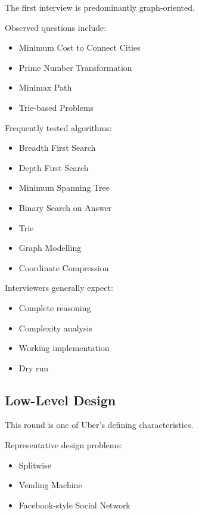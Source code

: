 \documentclass[11pt,a4paper]{article}
\begin{document}
The first interview is predominantly graph-oriented.

Observed questions include:

\begin{itemize}
	\item Minimum Cost to Connect Cities
	\item Prime Number Transformation
	\item Minimax Path
	\item Trie-based Problems
\end{itemize}

Frequently tested algorithms:

\begin{itemize}
	\item Breadth First Search
	\item Depth First Search
	\item Minimum Spanning Tree
	\item Binary Search on Answer
	\item Trie
	\item Graph Modelling
	\item Coordinate Compression
\end{itemize}

Interviewers generally expect:

\begin{itemize}
	\item Complete reasoning
	\item Complexity analysis
	\item Working implementation
	\item Dry run
\end{itemize}


\subsection{Low-Level Design}

This round is one of Uber's defining characteristics.

Representative design problems:

\begin{itemize}
	\item Splitwise
	\item Vending Machine
	\item Facebook-style Social Network
\end{itemize}
\end{document}
